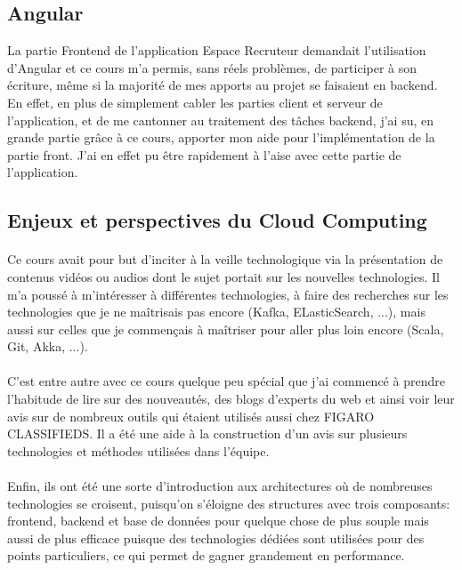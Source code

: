 \subsection{Angular}
\label{sub:Angular}
La partie Frontend de l'application Espace Recruteur demandait l'utilisation d'Angular et ce cours m'a permis, sans réels problèmes, de participer à son écriture, même si la majorité de mes apports au projet se faisaient en backend.
En effet, en plus de simplement cabler les parties client et serveur de l'application, et de me cantonner au traitement des tâches backend, j'ai su, en grande partie grâce à ce cours, apporter mon aide pour l'implémentation de la partie front.
J'ai en effet pu être rapidement à l'aise avec cette partie de l'application.

\subsection{Enjeux et perspectives du Cloud Computing}
\label{sub:Enjeux et perspectives du Cloud Computing}
\paragraph{}
Ce cours avait pour but d'inciter à la veille technologique via la présentation de contenus vidéos ou audios dont le sujet portait sur les nouvelles technologies.
Il m'a poussé à m'intéresser à différentes technologies, à faire des recherches sur les technologies que je ne maîtrisais pas encore (Kafka, ELasticSearch, ...), mais aussi sur celles que je commençais à maîtriser pour aller plus loin encore (Scala, Git, Akka, ...).
\paragraph{}
C'est entre autre avec ce cours quelque peu spécial que j'ai commencé à prendre l'habitude de lire sur des nouveautés, des blogs d'experts du web et ainsi voir leur avis sur de nombreux outils qui étaient utilisés aussi chez FIGARO CLASSIFIEDS.
Il a été une aide à la construction d'un avis sur plusieurs technologies et méthodes utilisées dans l'équipe.
\paragraph{}
Enfin, ils ont été une sorte d'introduction aux architectures où de nombreuses technologies se croisent, puisqu'on s'éloigne des structures avec trois composants: frontend, backend et base de données pour quelque chose de plus souple mais aussi de plus efficace puisque des technologies dédiées sont utilisées pour des points particuliers, ce qui permet de gagner grandement en performance.

